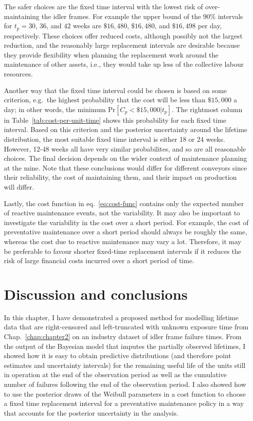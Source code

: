 

The safer choices are the fixed time interval with the lowest risk of over-maintaining the idler frames. For example the upper bound of the $90\%$ intervals for $t_p = 30$, $36$, and $42$ weeks are $\$16{,}480$, $\$16{,}480$, and $\$16{,}498$ per day, respectively. These choices offer reduced costs, although possibly not the largest reduction, and the reasonably large replacement intervals are desirable because they provide flexibility when planning the replacement work around the maintenance of other assets, i.e., they would take up less of the collective labour resources.

Another way that the fixed time interval could be chosen is based on some criterion, e.g.\ the highest probability that the cost will be less than $\$15{,}000$ a day; in other words, the minimum $\text{Pr}\left[C_p < \$15{,}000 | t_p \right]$. The rightmost column in Table~\ref{tab:cost-per-unit-time} shows this probability for each fixed time interval. Based on this criterion and the posterior uncertainty around the lifetime distribution, the most suitable fixed time interval is either 18 or 24 weeks. However, 12-48 weeks all have very similar probabilites, and so are all reasonable choices. The final decision depends on the wider context of maintenance planning at the mine. Note that these conclusions would differ for different conveyors since their reliability, the cost of maintaining them, and their impact on production will differ. 

Lastly, the cost function in eq.~\eqref{eq:cost-func} contains only the expected number of reactive maintenance events, not the variability. It may also be important to investigate the variability in the cost over a short period. For example, the cost of preventative maintenance over a short period should always be roughly the same, whereas the cost due to reactive maintenance may vary a lot. Therefore, it may be preferable to favour shorter fixed-time replacement intervals if it reduces the risk of large financial costs incurred over a short period of time.

\section{Discussion and conclusions} \label{sec:idler-frame-conclusions}

In this chapter, I have demonstrated a proposed method for modelling lifetime data that are right-censored and left-truncated with unknown exposure time from Chap.~\ref{chap:chapter2} on an industry dataset of idler frame failure times. From the output of the Bayesian model that imputes the partially observed lifetimes, I showed how it is easy to obtain predictive distributions (and therefore point estimates and uncertainty intervals) for the remaining useful life of the units still in operation at the end of the observation period as well as the cumulative number of failures following the end of the observation period. I also showed how to use the posterior draws of the Weibull parameters in a cost function to choose a fixed time replacement interval for a preventative maintenance policy in a way that accounts for the posterior uncertainty in the analysis.

